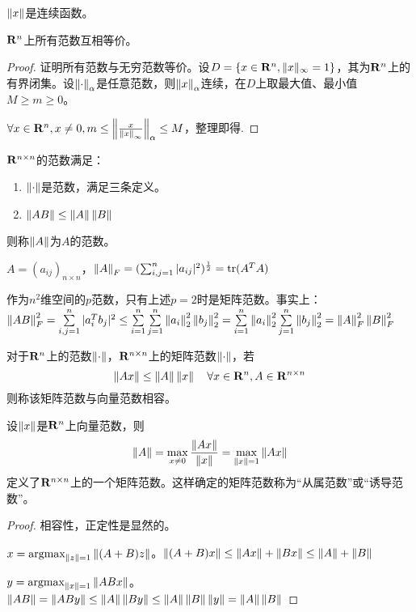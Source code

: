 \documentclass{ctexart}
\begin{document}
\begin{Cor}
$\left\|x\right\|$是连续函数。
\end{Cor}

\begin{Thm}
$\mathbf{R}^n$上所有范数互相等价。
\end{Thm}
\begin{proof}
证明所有范数与无穷范数等价。设$D=\{x\in\mathbf{R}^n,\|x\|_\infty=1\}$，其为$\mathbf{R}^n$上的有界闭集。设$\left\|\cdot\right\|_\alpha$是任意范数，则$\left\|x\right\|_\alpha$连续，在$D$上取最大值、最小值$M\geq m\geq 0$。

$\forall x\in\mathbf{R}^n,x\neq 0, m\leq \left\|\frac{x}{\left\|x\right\|_\infty}\right\|_\alpha\leq M$，整理即得.
\end{proof}


\begin{Def}[矩阵范数]
$\mathbf{R}^{n\times n}$的范数满足：
\begin{enumerate}
\item $\left\|\cdot\right\|$是范数，满足三条定义。
\item $\left\|AB\right\|\leq \left\|A\right\|\left\|B\right\|$
\end{enumerate}
则称$\left\|A\right\|$为$A$的范数。
\end{Def}

\begin{Eg}[Frobenius范数]
$A=(a_{ij})_{n\times n}$，$\left\|A\right\|_F=(\sum_{i,j=1}^n|a_{ij}|^2)^{\frac 1 2}=\mathrm{tr}(A^TA)$

作为$n^2$维空间的$p$范数，只有上述$p=2$时是矩阵范数。事实上：$\left\|AB\right\|_F^2=\sum\limits_{i,j=1}^n|a_i^Tb_j|^2\leq\sum\limits_{i=1}^n\sum\limits_{j=1}^n\left\|a_i\right\|_2^2\left\|b_j\right\|_2^2= \sum\limits_{i=1}^n\left\|a_i\right\|_2^2\sum\limits_{j=1}^n\left\|b_j\right\|_2^2=\left\|A\right\|^2_F\left\|B\right\|^2_F$
\end{Eg}

\begin{Def}
对于$\mathbf{R}^n$上的范数$\left\|\cdot\right\|$，$\mathbf{R}^{n\times n}$上的矩阵范数$\left\|\cdot\right\|$，若
\[\left\|Ax\right\|\leq \left\|A\right\|\left\|x\right\|\quad \forall x\in\mathbf{R}^n,A\in \mathbf{R}^{n\times n}\]
则称该矩阵范数与向量范数相容。
\end{Def}

\begin{Thm}
设$\left\|x\right\|$是$\mathbf{R}^n$上向量范数，则
\[\left\|A\right\|=\max_{x\neq 0}\frac{\left\|Ax\right\|}{\left\|x\right\|}=\max_{\left\|x\right\|=1}\left\|Ax\right\|\]
定义了$\mathbf{R}^{n\times n}$上的一个矩阵范数。这样确定的矩阵范数称为“从属范数”或“诱导范数”。
\end{Thm}
\begin{proof}
相容性，正定性是显然的。

$x=\mathrm{argmax}_{\left\|z\right\|=1}\left\|(A+B)z\right\|$。$\left\|(A+B)x\right\|\leq \left\|Ax\right\|+\left\|Bx\right\|\leq \left\|A\right\|+\left\|B\right\|$

$y=\mathrm{argmax}_{\left\|x\right\|=1}\left\|ABx\right\|$。$\left\|AB\right\|=\left\|ABy\right\|\leq \left\|A\right\|\left\|By\right\|\leq \left\|A\right\|\left\|B\right\|\left\|y\right\|=\left\|A\right\|\left\|B\right\|$

\end{proof}
\end{document}
